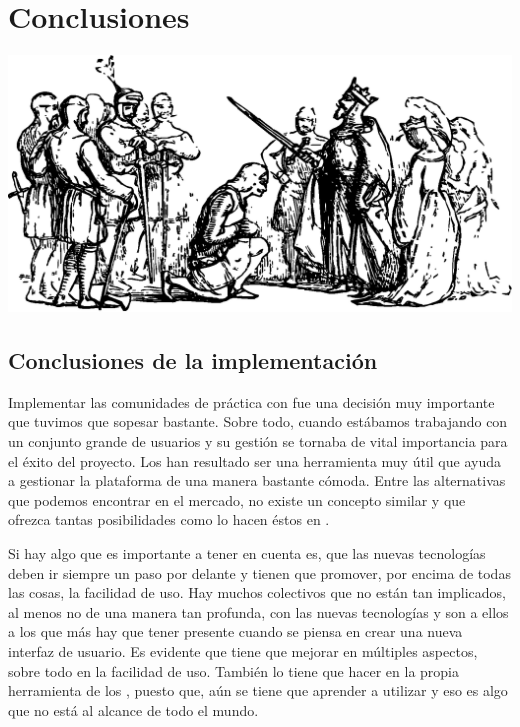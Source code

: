\chapter{Conclusiones} 
\label{chapter:conclusiones}

\begin{center}
\includegraphics[scale=0.4]{../graphics/johnny_automatic_Jack_and_King_Arthur.eps}
\end{center}

\section{Conclusiones de la implementación}

Implementar las comunidades de práctica con \tiki{} fue una decisión muy importante que tuvimos que sopesar bastante. Sobre todo, cuando estábamos trabajando con un conjunto grande de usuarios y su gestión se tornaba de vital importancia para el éxito del proyecto. Los \profiles{} han resultado ser una herramienta muy útil que ayuda a gestionar la plataforma de una manera bastante cómoda. Entre las alternativas que podemos encontrar en el mercado, no existe un concepto similar y que ofrezca tantas posibilidades como lo hacen éstos en \tiki{}.

Si hay algo que es importante a tener en cuenta es, que las nuevas tecnologías deben ir siempre un paso por delante y tienen que promover, por encima de todas las cosas, la facilidad de uso. Hay muchos colectivos que no están tan implicados, al menos no de una manera tan profunda, con las nuevas tecnologías y son a ellos a los que más hay que tener presente cuando se piensa en crear una nueva interfaz de usuario. Es evidente que \tiki{} tiene que mejorar en múltiples aspectos, sobre todo en la facilidad de uso. También lo tiene que hacer en la propia herramienta de los \profiles{}, puesto que, aún se tiene que aprender a utilizar \yaml{} y eso es algo que no está al alcance de todo el mundo. 

